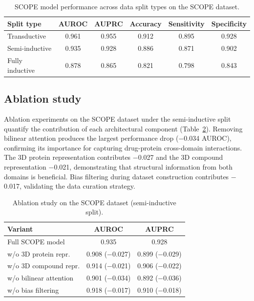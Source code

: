 \documentclass[11pt]{article}
\begin{document}
\begin{table}[htbp]
\centering
\caption{SCOPE model performance across data split types on the SCOPE dataset.}
\label{tab:splits}
\begin{tabular}{@{}lccccc@{}}
\toprule
Split type & AUROC & AUPRC & Accuracy & Sensitivity & Specificity \\
\midrule
Transductive    & 0.961 & 0.955 & 0.912 & 0.895 & 0.928 \\
Semi-inductive  & 0.935 & 0.928 & 0.886 & 0.871 & 0.902 \\
Fully inductive & 0.878 & 0.865 & 0.821 & 0.798 & 0.843 \\
\bottomrule
\end{tabular}
\end{table}

\subsection{Ablation study}

Ablation experiments on the SCOPE dataset under the semi-inductive split quantify the contribution of each architectural component (Table~\ref{tab:ablation}). Removing bilinear attention produces the largest performance drop ($-$0.034 AUROC), confirming its importance for capturing drug-protein cross-domain interactions. The 3D protein representation contributes $-$0.027 and the 3D compound representation $-$0.021, demonstrating that structural information from both domains is beneficial. Bias filtering during dataset construction contributes $-$0.017, validating the data curation strategy.

\begin{table}[htbp]
\centering
\caption{Ablation study on the SCOPE dataset (semi-inductive split).}
\label{tab:ablation}
\begin{tabular}{@{}lcc@{}}
\toprule
Variant & AUROC & AUPRC \\
\midrule
Full SCOPE model         & 0.935          & 0.928          \\
w/o 3D protein repr.     & 0.908 ($-$0.027) & 0.899 ($-$0.029) \\
w/o 3D compound repr.    & 0.914 ($-$0.021) & 0.906 ($-$0.022) \\
w/o bilinear attention   & 0.901 ($-$0.034) & 0.892 ($-$0.036) \\
w/o bias filtering       & 0.918 ($-$0.017) & 0.910 ($-$0.018) \\
\bottomrule
\end{tabular}
\end{table}
\end{document}

